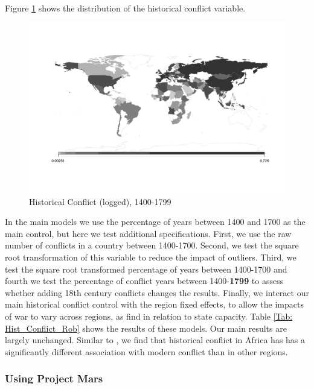 \documentclass[12pt]{article}
\begin{document}
Figure \ref{Fig: BreckeMap} shows the distribution of the historical conflict variable. 

   \begin{figure}[H] \hspace{-0,5cm} 
   \includegraphics[width=\textwidth,
    height=\textheight, keepaspectratio]{img/historical_conflict_map.png} \caption{Historical Conflict (logged), 1400-1799} \label{Fig: BreckeMap} \end{figure}

In the main models we use the percentage of years between 1400 and 1700 as the main control, but here we test additional specifications. First, we use the raw number of conflicts in a country between 1400-1700. Second, we test the square root transformation of this variable to reduce the impact of outliers. Third, we test the square root transformed percentage of years between 1400-1700 and fourth we test the percentage of conflict years between 1400-\textbf{1799} to assess whether adding 18th century conflicts changes the results. Finally, we interact our main historical conflict control with the region fixed effects, to allow the impacts of war to vary across regions, as \citet{Dincecco2019} find in relation to state capacity. Table \ref{Tab: Hist_Conflict_Rob} shows the results of these models. Our main results are largely unchanged. Similar to \citet{Dincecco2019}, we find that historical conflict in Africa has has a significantly different association with modern conflict than in other regions. 

     

\clearpage

\subsubsection{Using Project Mars}
\end{document}
